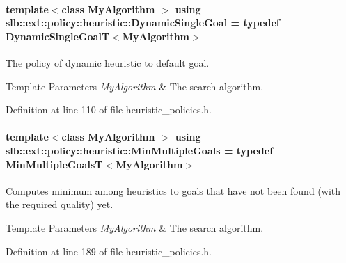 \paragraph[{\texorpdfstring{Dynamic\+Single\+Goal}{DynamicSingleGoal}}]{\setlength{\rightskip}{0pt plus 5cm}template$<$class My\+Algorithm $>$ using {\bf slb\+::ext\+::policy\+::heuristic\+::\+Dynamic\+Single\+Goal} = typedef {\bf Dynamic\+Single\+GoalT}$<$My\+Algorithm$>$}\hypertarget{namespaceslb_1_1ext_1_1policy_1_1heuristic_abd4d8d1b33c56751ff726b83181b0609}{}\label{namespaceslb_1_1ext_1_1policy_1_1heuristic_abd4d8d1b33c56751ff726b83181b0609}


The policy of dynamic heuristic to default goal. 


\begin{DoxyTemplParams}{Template Parameters}
{\em My\+Algorithm} & The search algorithm. \\
\hline
\end{DoxyTemplParams}


Definition at line 110 of file heuristic\+\_\+policies.\+h.

\paragraph[{\texorpdfstring{Min\+Multiple\+Goals}{MinMultipleGoals}}]{\setlength{\rightskip}{0pt plus 5cm}template$<$class My\+Algorithm $>$ using {\bf slb\+::ext\+::policy\+::heuristic\+::\+Min\+Multiple\+Goals} = typedef {\bf Min\+Multiple\+GoalsT}$<$My\+Algorithm$>$}\hypertarget{namespaceslb_1_1ext_1_1policy_1_1heuristic_adb60983019024c0557fb57be8feab48c}{}\label{namespaceslb_1_1ext_1_1policy_1_1heuristic_adb60983019024c0557fb57be8feab48c}


Computes minimum among heuristics to goals that have not been found (with the required quality) yet. 


\begin{DoxyTemplParams}{Template Parameters}
{\em My\+Algorithm} & The search algorithm. \\
\hline
\end{DoxyTemplParams}


Definition at line 189 of file heuristic\+\_\+policies.\+h.

